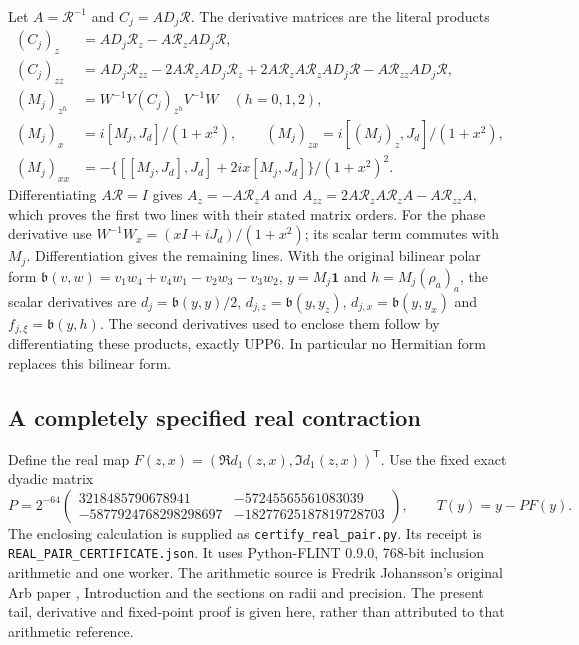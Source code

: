 \documentclass[11pt]{article}
\begin{document}
Let $A=\mathcal R^{-1}$ and $C_j=AD_j\mathcal R$.
The derivative matrices are the literal products
\[
 \begin{aligned}
 (C_j)_z&=AD_j\mathcal R_z-A\mathcal R_zAD_j\mathcal R,\\
 (C_j)_{zz}&=AD_j\mathcal R_{zz}-2A\mathcal R_zAD_j\mathcal R_z
       +2A\mathcal R_zA\mathcal R_zAD_j\mathcal R
       -A\mathcal R_{zz}AD_j\mathcal R,\\
 (M_j)_{z^h}&=W^{-1}V(C_j)_{z^h}V^{-1}W\quad(h=0,1,2),\\
 (M_j)_x&=i[M_j,J_d]/(1+x^2),\qquad
 (M_j)_{zx}=i[(M_j)_z,J_d]/(1+x^2),\\
 (M_j)_{xx}&=-\{[[M_j,J_d],J_d]+2ix[M_j,J_d]\}/(1+x^2)^2.
 \end{aligned}\tag{RPZ9}
\]
Differentiating $A\mathcal R=I$ gives
$A_z=-A\mathcal R_zA$ and
$A_{zz}=2A\mathcal R_zA\mathcal R_zA-A\mathcal R_{zz}A$,
which proves the first two lines with their stated matrix orders.
For the phase derivative use
$W^{-1}W_x=(xI+iJ_d)/(1+x^2)$; its scalar term commutes with
$M_j$. Differentiation gives the remaining lines. With the original
bilinear polar form
$\mathfrak b(v,w)=v_1w_4+v_4w_1-v_2w_3-v_3w_2$,
$y=M_j\boldsymbol1$ and $h=M_j(\rho_a)_a$, the scalar derivatives
are $d_j=\mathfrak b(y,y)/2$,
$d_{j,z}=\mathfrak b(y,y_z)$,
$d_{j,x}=\mathfrak b(y,y_x)$ and
$f_{j,\xi}=\mathfrak b(y,h)$. The second derivatives used to
enclose them follow by differentiating these products, exactly
UPP6. In particular no Hermitian form replaces this bilinear form.

\subsection{A completely specified real contraction}
Define the real map $F(z,x)=(\Re d_1(z,x),\Im d_1(z,x))^{\mathsf T}$.
Use the fixed exact dyadic matrix
\[
 P=2^{-64}\begin{pmatrix}
 3218485790678941&-57245565561083039\\
 -5877924768298298697&-18277625187819728703
 \end{pmatrix},\qquad T(y)=y-PF(y).\tag{RPZ10}
\]
The enclosing calculation is supplied as
\nolinkurl{certify_real_pair.py}.
Its receipt is \nolinkurl{REAL_PAIR_CERTIFICATE.json}.
It uses Python-FLINT 0.9.0,
768-bit inclusion arithmetic and one worker. The arithmetic source
is Fredrik Johansson's original Arb paper \cite{human:arb2016},
Introduction and the sections on radii and precision. The present
tail, derivative and fixed-point proof is given here, rather than
attributed to that arithmetic reference.
\end{document}

